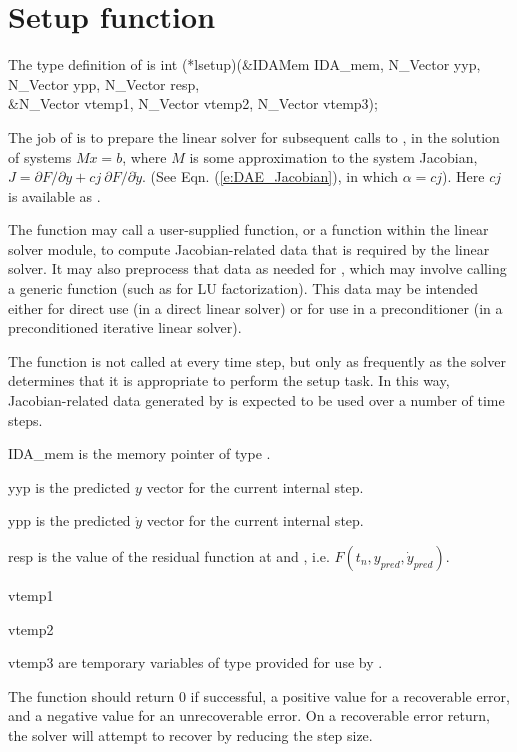 \section{Setup function} 
The type definition of  is
{
   int (*lsetup)(&IDAMem IDA\_mem, N\_Vector yyp, N\_Vector ypp, 
                 N\_Vector resp,\\
                 &N\_Vector vtemp1, N\_Vector vtemp2, N\_Vector vtemp3); 
}
{
  The job of  is to prepare the linear solver for subsequent 
  calls to , in the solution of systems $M x = b$, where         
  $M$ is some approximation to the system Jacobian,
  $J = \partial F / \partial y + cj ~ \partial F / \partial \dot{y}$. 
  (See Eqn. (\ref{e:DAE_Jacobian}), in which $\alpha = cj$).
  Here $cj$ is available as .

  The  function may call a user-supplied function, or a function
  within the linear solver module, to compute Jacobian-related data
  that is required by the linear solver.  It may also preprocess that
  data as needed for , which may involve calling a generic
  function (such as for LU factorization).  This data may be intended
  either for direct use (in a direct linear solver) or for use in a
  preconditioner (in a preconditioned iterative linear solver).

  The  function is not called at every time step, but only
  as frequently as the solver determines that it is appropriate to perform
  the setup task.  In this way, Jacobian-related data generated by 
  is expected to be used over a number of time steps.
}
{
   \begin{args}
   \item[IDA\_mem] 
     is the {\idas} memory pointer of type .
  
   \item[yyp]
     is the predicted $y$ vector for the current {\idas} internal step.
  
   \item[ypp]
     is the predicted $\dot{y}$ vector for the current {\idas} internal step.
  
   \item[resp]
     is the value of the residual function at  and , i.e.
     $F(t_n, y_{pred}, \dot{y}_{pred})$.
  
   \item[vtemp1] 
   \item[vtemp2]
   \item[vtemp3] 
     are temporary variables of type  provided for use by .      
  
   \end{args}
}
{
  The  function should return 0 if successful,            
  a positive value for a recoverable error, and a negative value  
  for an unrecoverable error.  On a recoverable error return, the
  solver will attempt to recover by reducing the step size.
}
{}


